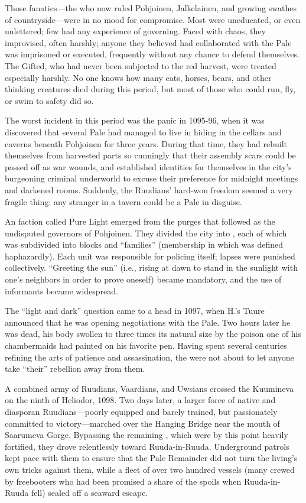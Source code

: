\documentclass[12pt]{report}
\begin{document}
Those fanatics---the {\aemott} who now ruled Pohjoinen, Jalkelainen,
and growing swathes of countryside---were in no mood for compromise.
Most were uneducated, or even unlettered; few had any experience of
governing.  Faced with chaos, they improvised, often harshly; anyone
they believed had collaborated with the Pale was imprisoned or
executed, frequently without any chance to defend themselves.  The
Gifted, who had never been subjected to the red harvest, were treated
especially harshly.  No one knows how many cats, horses, bears, and
other thinking creatures died during this period, but most of those
who could run, fly, or swim to safety did so.

The worst incident in this period was the panic in 1095-96, when it
was discovered that several Pale had managed to live in hiding in the
cellars and caverns beneath Pohjoinen for three years.  During that
time, they had rebuilt themselves from harvested parts so cunningly
that their assembly scars could be passed off as war wounds, and
established identities for themselves in the city's burgeoning
criminal underworld to excuse their preference for midnight meetings
and darkened rooms.  Suddenly, the Ruudians' hard-won freedom seemed a
very fragile thing: any stranger in a tavern could be a Pale in
disguise.

An {\aemott} faction called Pure Light emerged from the purges that
followed as the undisputed governors of Pohjoinen.  They divided the
city into , each of which was subdivided into blocks
and ``families'' (membership in which was defined haphazardly).  Each
unit was responsible for policing itself; lapses were punished
collectively.  ``Greeting the sun'' (i.e., rising at dawn to stand in
the sunlight with one's neighbors in order to prove oneself) became
mandatory, and the use of informants became widespread.

The ``light and dark'' question came to a head in 1097, when H.'s Tuure
announced that he was opening negotiations with the Pale.  Two hours
later he was dead, his body swollen to three times its natural size by
the poison one of his chambermaids had painted on his favorite pen.
Having spent several centuries refining the arts of patience and
assassination, the {\aemott} were not about to let anyone take ``their''
rebellion away from them.

A combined army of Ruudians, Vaardians, and Uwsians crossed the
Kuumineva on the ninth of Heliodor, 1098.  Two days later, a larger
force of native and diasporan Ruudians---poorly equipped and barely
trained, but passionately committed to victory---marched over the
Hanging Bridge near the mouth of Saarumeva Gorge.  Bypassing the
remaining , which were by this point heavily
fortified, they drove relentlessly toward Ruuda-in-Ruuda.  Underground
patrols kept pace with them to ensure that the Pale Remainder did not
turn the living's own tricks against them, while a fleet of over two
hundred vessels (many crewed by freebooters who had been promised a
share of the spoils when Ruuda-in-Ruuda fell) sealed off a seaward
escape.
\end{document}
